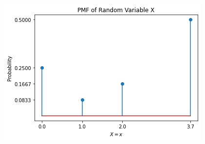 \documentclass[journal,12pt,twocolumn]{IEEEtran}
\begin{document}
\vfill\eject
\begin{figure}[ht]
    \centering
    \includegraphics[width=\columnwidth]{PMF.png}
    \label{fig:2}
\end{figure}
\end{document}
